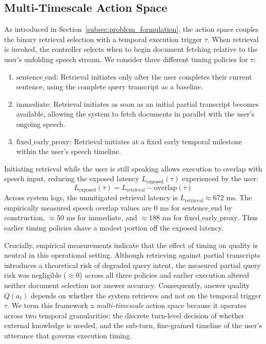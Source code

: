\subsection{Multi-Timescale Action Space}
\label{subsec:action_space}

As introduced in Section~\ref{subsec:problem_formulation}, the action space couples the binary retrieval selection with a temporal execution trigger $\tau$. When retrieval is invoked, the controller selects when to begin document fetching relative to the user's unfolding speech stream. We consider three different timing policies for $\tau$:
\begin{enumerate}
    \item $\text{sentence\_end}$: Retrieval initiates only after the user completes their current sentence, using the complete query transcript as a baseline.
    \item $\text{immediate}$: Retrieval initiates as soon as an initial partial transcript becomes available, allowing the system to fetch documents in parallel with the user's ongoing speech.
    \item $\text{fixed\_early\_proxy}$: Retrieval initiates at a fixed early temporal milestone within the user's speech timeline.
\end{enumerate}

Initiating retrieval while the user is still speaking allows execution to overlap with speech input, reducing the exposed latency $L_{\text{exposed}}(\tau)$ experienced by the user:
\begin{equation}
L_{\text{exposed}}(\tau) = L_{\text{retrieval}} - \text{overlap}(\tau)
\end{equation}
Across system logs, the unmitigated retrieval latency is $L_{\text{retrieval}} \approx 672\text{ ms}$. The empirically measured speech overlap values are $0\text{ ms}$ for $\text{sentence\_end}$ by construction, $\approx 50\text{ ms}$ for $\text{immediate}$, and $\approx 188\text{ ms}$ for $\text{fixed\_early\_proxy}$. Thus earlier timing policies shave a modest portion off the exposed latency.

Crucially, empirical measurements indicate that the effect of timing on quality is neutral in this operational setting. Although retrieving against partial transcripts introduces a theoretical risk of degraded query intent, the measured partial query risk was negligible ($\approx 0$) across all three policies and earlier execution altered neither document selection nor answer accuracy. Consequently, answer quality $Q(a_t)$ depends on whether the system retrieves and not on the temporal trigger $\tau$.
We term this framework a \textit{multi-timescale} action space because it operates across two temporal granularities: the discrete turn-level decision of whether external knowledge is needed, and the sub-turn, fine-grained timeline of the user's utterance that governs execution timing.

